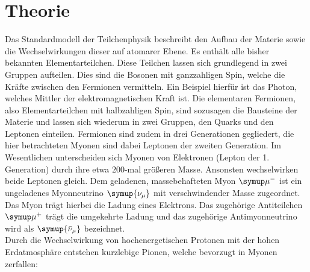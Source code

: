 \section{Theorie}
\label{sec:Theorie}
Das Standardmodell der Teilchenphysik beschreibt den Aufbau der Materie sowie die Wechselwirkungen dieser auf atomarer Ebene.
Es enthält alle bisher bekannten Elementarteilchen. Diese Teilchen lassen sich grundlegend in zwei Gruppen aufteilen.
Dies sind die Bosonen mit ganzzahligen Spin, welche die Kräfte zwischen den Fermionen vermitteln. Ein Beispiel hierfür ist das Photon, welches Mittler der elektromagnetischen Kraft ist.
Die elementaren Fermionen, also Elementarteilchen mit halbzahligen Spin, sind sozusagen die Bausteine der Materie und lassen sich wiederum in zwei Gruppen, den Quarks und den Leptonen einteilen.
Fermionen sind zudem in drei Generationen gegliedert, die hier betrachteten Myonen sind dabei Leptonen der zweiten Generation.
Im Wesentlichen unterscheiden sich Myonen von Elektronen (Lepton der 1. Generation) durch ihre etwa $200$-mal größeren Masse. Ansonsten wechselwirken beide Leptonen gleich.
Dem geladenen, massebehafteten Myon $\symup\mu^-$ ist ein ungeladenes Myonneutrino $\symup{\nu_{\mu}}$ mit verschwindender Masse zugeordnet. Das Myon trägt hierbei die Ladung eines Elektrons. Das zugehörige Antiteilchen $\symup\mu^+$ trägt die umgekehrte Ladung und das zugehörige Antimyonneutrino wird als $\symup{\bar{\nu}_{\mu}}$ bezeichnet.
\\
Durch die Wechselwirkung von hochenergetischen Protonen mit der hohen Erdatmosphäre entstehen kurzlebige Pionen, welche bevorzugt in Myonen zerfallen:

